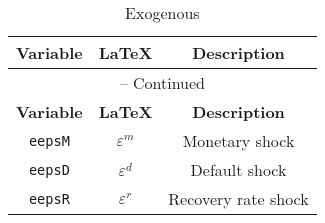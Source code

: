 \begin{center}
\begin{longtable}{ccc}
\caption{Exogenous}\\%
\hline%
\multicolumn{1}{c}{\textbf{Variable}} &
\multicolumn{1}{c}{\textbf{\LaTeX}} &
\multicolumn{1}{c}{\textbf{Description}}\\%
\hline\hline%
\endfirsthead
\multicolumn{3}{c}{{\tablename} \thetable{} -- Continued}\\%
\hline%
\multicolumn{1}{c}{\textbf{Variable}} &
\multicolumn{1}{c}{\textbf{\LaTeX}} &
\multicolumn{1}{c}{\textbf{Description}}\\%
\hline\hline%
\endhead
\texttt{eepsM} & ${\varepsilon^{m}}$ & Monetary shock\\
\texttt{eepsD} & ${\varepsilon^{d}}$ & Default shock\\
\texttt{eepsR} & ${\varepsilon^{r}}$ & Recovery rate shock\\
\hline%
\end{longtable}
\end{center}
